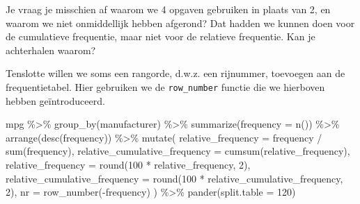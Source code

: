 \documentclass[]{tufte-book}
\newenvironment{Shaded}{}{}
\newcommand{\AttributeTok}[1]{\textcolor[rgb]{0.49,0.56,0.16}{#1}}
\newcommand{\DecValTok}[1]{\textcolor[rgb]{0.25,0.63,0.44}{#1}}
\newcommand{\FunctionTok}[1]{\textcolor[rgb]{0.02,0.16,0.49}{#1}}
\newcommand{\NormalTok}[1]{#1}
\newcommand{\SpecialCharTok}[1]{\textcolor[rgb]{0.25,0.44,0.63}{#1}}
\begin{document}
Je vraag je misschien af waarom we 4 opgaven gebruiken in plaats van 2, en waarom we niet onmiddellijk hebben afgerond? Dat hadden we kunnen doen voor de cumulatieve frequentie, maar niet voor de relatieve frequentie. Kan je achterhalen waarom?

Tenslotte willen we soms een rangorde, d.w.z. een rijnummer, toevoegen aan de frequentietabel. Hier gebruiken we de \texttt{row\_number} functie die we hierboven hebben geïntroduceerd.

\begin{Shaded}
\begin{Highlighting}[]
\NormalTok{mpg }\SpecialCharTok{\%\textgreater{}\%}
  \FunctionTok{group\_by}\NormalTok{(manufacturer) }\SpecialCharTok{\%\textgreater{}\%}
  \FunctionTok{summarize}\NormalTok{(}\AttributeTok{frequency =} \FunctionTok{n}\NormalTok{()) }\SpecialCharTok{\%\textgreater{}\%}
  \FunctionTok{arrange}\NormalTok{(}\FunctionTok{desc}\NormalTok{(frequency)) }\SpecialCharTok{\%\textgreater{}\%}
  \FunctionTok{mutate}\NormalTok{(}
    \AttributeTok{relative\_frequency =}\NormalTok{ frequency }\SpecialCharTok{/} \FunctionTok{sum}\NormalTok{(frequency),}
    \AttributeTok{relative\_cumulative\_frequency =} \FunctionTok{cumsum}\NormalTok{(relative\_frequency),}
    \AttributeTok{relative\_frequency =} \FunctionTok{round}\NormalTok{(}\DecValTok{100} \SpecialCharTok{*}\NormalTok{ relative\_frequency, }\DecValTok{2}\NormalTok{),}
    \AttributeTok{relative\_cumulative\_frequency =} \FunctionTok{round}\NormalTok{(}\DecValTok{100} \SpecialCharTok{*}\NormalTok{ relative\_cumulative\_frequency, }\DecValTok{2}\NormalTok{),}
    \AttributeTok{nr =} \FunctionTok{row\_number}\NormalTok{(}\SpecialCharTok{{-}}\NormalTok{frequency)}
\NormalTok{  ) }\SpecialCharTok{\%\textgreater{}\%}
  \FunctionTok{pander}\NormalTok{(}\AttributeTok{split.table =} \DecValTok{120}\NormalTok{)}
\end{Highlighting}
\end{Shaded}
\end{document}
